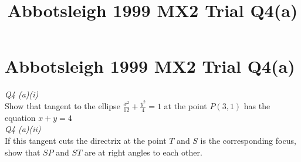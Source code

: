 \documentclass[11pt,a4paper]{article}
\title{Abbotsleigh 1999 MX2 Trial Q4(a)}
\author{}
\date{}
\begin{document}
\section*{Abbotsleigh 1999 MX2 Trial Q4(a)}
\textit{Q4 (a)(i)}\\[1em]
Show that tangent to the ellipse $\displaystyle\frac{x^2}{12} + 
\frac{y^2}{4} = 1$ at the point $P(3,1)$ has the equation $x 
+ y = 4$\\[1em]
\textit{Q4 (a)(ii)}\\[1em]
If this tangent cuts the directrix at the point $T$ and $S$ is the corresponding focus, show that $SP$ and $ST$ are at right angles to each 
other.\\
\end{document}
